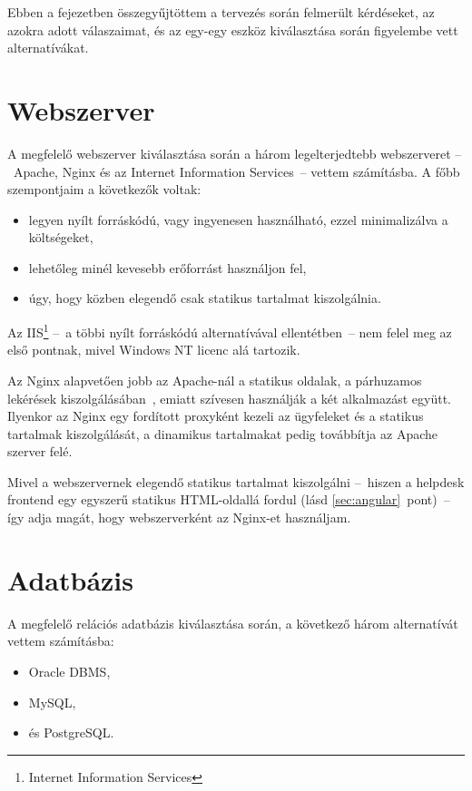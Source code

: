 Ebben a fejezetben összegyűjtöttem a tervezés során felmerült kérdéseket, az azokra adott válaszaimat, és az egy-egy eszköz kiválasztása során figyelembe vett alternatívákat.



\section{Webszerver}
A megfelelő webszerver kiválasztása során a három legelterjedtebb\cite{W3Techs_Usage_statistics_of_webservers} webszerveret --~Apache, Nginx és az Internet Information Services~-- vettem számításba. A főbb szempontjaim a következők voltak:
\begin{itemize}
	\item legyen nyílt forráskódú, vagy ingyenesen használható, ezzel minimalizálva a költségeket,
	\item lehetőleg minél kevesebb erőforrást használjon fel,
	\item úgy, hogy közben elegendő csak statikus tartalmat kiszolgálnia.
\end{itemize}

Az IIS\footnote{Internet Information Services} --~a többi nyílt forráskódú alternatívával ellentétben~--   nem felel meg az első pontnak, mivel Windows NT licenc alá tartozik.

Az Nginx alapvetően jobb az Apache-nál a statikus oldalak, a párhuzamos lekérések kiszolgálásában~\cite{nginx_performance}, emiatt szívesen használják a két alkalmazást együtt. Ilyenkor az Nginx egy fordított proxyként kezeli az ügyfeleket és a statikus tartalmak kiszolgálását, a dinamikus tartalmakat pedig továbbítja az Apache szerver felé.

Mivel a webszervernek elegendő statikus tartalmat kiszolgálni --~hiszen a helpdesk frontend egy egyszerű statikus HTML-oldallá fordul (lásd \ref{sec:angular}~pont)~--   így adja magát, hogy webszerverként az Nginx-et használjam.




\section{Adatbázis}
A megfelelő relációs adatbázis kiválasztása során, a következő három alternatívát vettem számításba:
\begin{itemize}
	\item Oracle DBMS,
	\item MySQL,
	\item és PostgreSQL.
\end{itemize}

